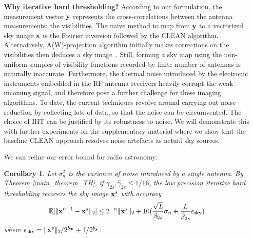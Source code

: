 \documentclass{article}
\newtheorem{corollary}{Corollary}
\begin{document}
{\bf Why iterative hard thresholding?} According to our formulation, the measurement vector ${\bf y}$ represents the cross-correlations between the antenna measurements: the visibilities. The naive method to map from ${\bf y}$ to a vectorized sky image ${\bf x}$ is the Fourier inversion followed by the {CLEAN} algorithm. Alternatively, {A(W)-projection} algorithm initially makes corrections on the visibilities then deduces a sky image~\cite{bhatganar2008ra}. Still, forming a sky map using the non-uniform samples of visibility functions recorded by finite number of antennas is naturally inaccurate. Furthermore, the thermal noise introduced by the electronic instruments embedded in the RF antenna receivers heavily corrupt the weak incoming signal, and therefore pose a further challenge for these imaging algorithms. To date, the current techniques revolve around carrying out noise reduction by collecting lots of data, so that the noise can be circumvented. The choice of IHT can be justified by its robustness to noise. We will demonstrate this with further experiments on the supplementary material where we show that the baseline {CLEAN} approach resolves noise artefacts as actual sky sources.

We can refine our error bound for radio astronomy:

\begin{corollary}
Let $\sigma_n^2$ is the variance of noise introduced by a single antenna. By Theorem \ref{main_theorem_TH}, if ${\gamma}_{2s}, \hat{\gamma}_{2s}\leq 1/16$, the low precision iterative hard thresholding recovers the sky image ${\bf x}^s$ with accuracy
\begin{equation}
    \mathbb{E}[\|{\bf x}^{n+1} - {\bf x}^s \|_2] \leq 2^{-n}\| {\bf x}^s\|_2 + 10(\frac{\sqrt{L}}{\beta_{2s}}\sigma_n+\frac{L}{\hat{\beta}_{2s}}\epsilon_{\rm{sky}})
\end{equation}
where $\epsilon_{\rm{sky}} =  \|{\bf x}^s \|_2/2^{b_{\bf \Phi}} + 1/2^{b_{\bf y}}$.
\label{corollary1}
\end{corollary}


\end{document}
